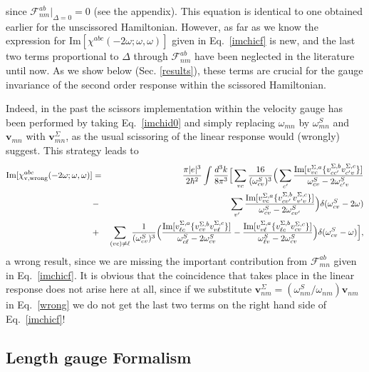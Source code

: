 \documentclass[floatfix,prb,aps,superscriptaddress,11pt]{revtex4}
\begin{document}
since $\mathcal{F}_{nm}^{ab}|_{\Delta=0}=0$ (see the appendix). This
equation is identical to one obtained earlier for the unscissored
Hamiltonian.\cite{ghahramaniPRB91} However,
as far as we know the expression for 
$\mbox{Im}[\chi ^{abc}(-2\omega;\omega,\omega)]$ 
given in Eq.~\eqref{imchicf} is new, and the last two terms
proportional to $\Delta$ through $\mathcal{F}_{nm}^{ab}$ have been neglected in
the literature until now. As we show below (Sec. \ref{results}), these terms
are crucial for the gauge invariance of the second order response within the
scissored Hamiltonian.

Indeed, in the past the scissors implementation within the velocity gauge
has been performed by taking Eq.~\eqref{imchid0} and simply replacing $\omega
_{mn}$ by $\omega_{mn}^{S}$ and $\mathbf{v}_{mn}$ with $\mathbf{v}_{mn}^{\Sigma}$, as the
usual scissoring of the linear response
would (wrongly) suggest. This strategy leads to 
\begin{eqnarray}
\mbox{Im}\lbrack \chi _{\mathrm{v,wrong}}^{abc}(-2\omega;\omega,\omega)] &=&\frac{\pi
|e|^{3}}{2\hbar ^{2}}\int \frac{d^{3}k}{8\pi ^{3}}\Big[\sum_{vc}\frac{16}{(
\omega_{cv}^{S})^{3}}\Big(\sum_{c^{\prime }}\frac{\mbox{Im}\lbrack
v_{vc}^{\Sigma ,a}\{v_{cc^{\prime }}^{\Sigma ,b}v_{c^{\prime }v}^{\Sigma
,c}\}]}{\omega_{cv}^{S}-2\omega_{c^{\prime }v}^{S}}  \notag  \label{wrong} \\
&-&\sum_{v^{\prime }}\frac{\mbox{Im}\lbrack v_{vc}^{\Sigma
,a}\{v_{cv^{\prime }}^{\Sigma ,b}v_{v^{\prime }v}^{\Sigma ,c}\}]}{\omega
_{cv}^{S}-2\omega_{cv^{\prime }}^{S}}\Big)\delta(\omega_{cv}^{S}-2\omega)  \notag \\
&+&\sum_{(vc)\neq\ell }\frac{1}{(\omega_{cv}^{S})^{3}}\Big(\frac{\mbox{Im}\lbrack
v_{\ell c}^{\Sigma ,a}\{v_{cv}^{\Sigma ,b}v_{v\ell }^{\Sigma ,c}\}]}{\omega
_{c\ell }^{S}-2\omega_{cv}^{S}}-\frac{\mbox{Im}\lbrack v_{v\ell }^{\Sigma
,a}\{v_{\ell c}^{\Sigma ,b}v_{cv}^{\Sigma ,c}\}]}{\omega_{\ell v}^{S}-2\omega
_{cv}^{S}}\Big)\delta(\omega_{cv}^{S}-\omega)\Big],
\end{eqnarray}
a wrong result, since we are missing the important contribution from 
$\mathcal{F}_{mn}^{ab}$ given in Eq.~\eqref{imchicf}. It is obvious that the
coincidence that takes place in the linear response does not arise here at
all, since if we substitute $\mathbf{v}_{nm}^{\Sigma}=(\omega_{nm}^{S}/\omega_{nm})\mathbf{v}_{nm}
$ in Eq.~\eqref{wrong} we do not get the last two terms on the right hand
side of Eq.~\eqref{imchicf}!


\subsection{Length gauge Formalism}
\end{document}

